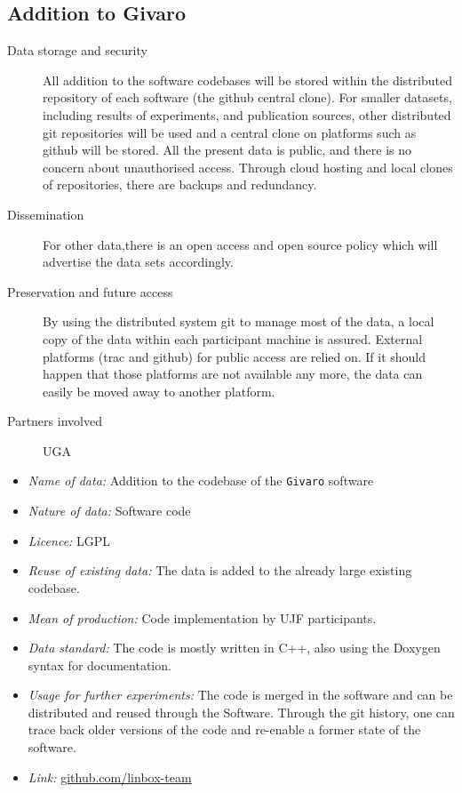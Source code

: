 \documentclass{deliverablereport}
\begin{document}
\begin{enumerate}
\subsection{Addition to Givaro}

\begin{description}
\item[Data storage and security] All addition to the software codebases will be stored within the distributed repository of each software (the github central clone). For smaller datasets, including results of experiments, and publication sources, other distributed git repositories will be used and a central clone on platforms such as github will be stored. All the present data is public, and there is no concern about unauthorised access. Through cloud hosting and local clones of repositories, there are backups and redundancy.
\item[Dissemination] For other data,there is an open access and open source policy which will advertise the data sets accordingly.
\item[Preservation and future access] By using the distributed system git to manage most of the data, a local copy of the data within each participant machine is assured. External platforms (trac and github) for public access are relied on. If it should happen that those platforms are not available any more, the data can easily be moved away to another platform.
\item[Partners involved] UGA
\end{description}


\begin{itemize}
\item\textit{Name of data:} Addition to the codebase of the \texttt{Givaro} software
\item\textit{Nature of data:} Software code
\item\textit{Licence:} LGPL
\item\textit{Reuse of existing data:} The data is added to the already large existing codebase.
\item\textit{Mean of production:} Code implementation by UJF participants.
\item\textit{Data standard:} The code is mostly written in C++, also using the Doxygen syntax for documentation.
\item\textit{Usage for further experiments:} The code is merged in the software and can be distributed and reused through the Software. Through the git history,
one can trace back older versions of the code and re-enable a former state of the software.
\item\textit{Link:} \href{https://github.com/linbox-team}{github.com/linbox-team}
\end{itemize}




\end{enumerate}
\end{document}

